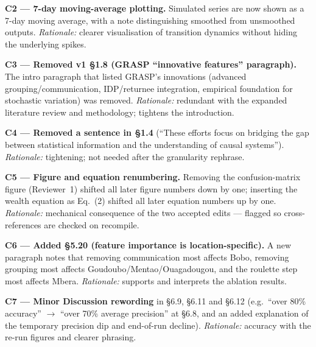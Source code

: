 \documentclass[11pt,a4paper]{article}
\begin{document}
\begin{authorbox}
\textbf{C2 --- 7-day moving-average plotting.} Simulated series are now shown as a 7-day moving average, with a
note distinguishing smoothed from unsmoothed outputs. \emph{Rationale:} clearer visualisation of transition
dynamics without hiding the underlying spikes.
\end{authorbox}

\begin{authorbox}
\textbf{C3 --- Removed v1 §1.8 (GRASP ``innovative features'' paragraph).} The intro paragraph that listed GRASP's
innovations (advanced grouping/communication, IDP/returnee integration, empirical foundation for stochastic
variation) was removed. \emph{Rationale:} redundant with the expanded literature review and methodology; tightens
the introduction.
\end{authorbox}

\begin{authorbox}
\textbf{C4 --- Removed a sentence in §1.4} (``These efforts focus on bridging the gap between statistical
information and the understanding of causal systems''). \emph{Rationale:} tightening; not needed after the
granularity rephrase.
\end{authorbox}

\begin{authorbox}
\textbf{C5 --- Figure and equation renumbering.} Removing the confusion-matrix figure (Reviewer~1) shifted all
later figure numbers down by one; inserting the wealth equation as Eq.~(2) shifted all later equation numbers up
by one. \emph{Rationale:} mechanical consequence of the two accepted edits --- flagged so cross-references are
checked on recompile.
\end{authorbox}

\begin{authorbox}
\textbf{C6 --- Added §5.20 (feature importance is location-specific).} A new paragraph notes that removing
communication most affects Bobo, removing grouping most affects Goudoubo/Mentao/Ouagadougou, and the roulette
step most affects Mbera. \emph{Rationale:} supports and interprets the ablation results.
\end{authorbox}

\begin{authorbox}
\textbf{C7 --- Minor Discussion rewording} in §6.9, §6.11 and §6.12 (e.g.\ ``over 80\% accuracy'' $\rightarrow$
``over 70\% average precision'' at §6.8, and an added explanation of the temporary precision dip and end-of-run
decline). \emph{Rationale:} accuracy with the re-run figures and clearer phrasing.
\end{authorbox}
\end{document}
